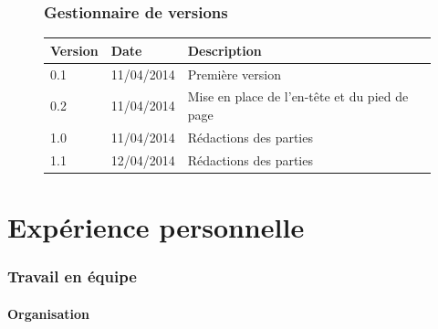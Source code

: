 \documentclass[12pt]{article}
\begin{document}
\setcounter{page}{2}
    	\begin{figure}[h]
        	\section*{Gestionnaire de versions}
		\centering
        	\begin{tabular}{|l|l|l|}
			\hline
            	\textbf{Version} & \textbf{Date} & \textbf{Description} \\
            	\hline
            	\hline
            		0.1 & 11/04/2014 & Première version \\
            	\hline
			0.2 & 11/04/2014 & Mise en place de l'en-tête et du pied de page \\
            	\hline
			1.0 & 11/04/2014 & Rédactions des parties \\
            	\hline
			1.1 & 12/04/2014 & Rédactions des parties \\
            	\hline
        	\end{tabular}
    	\end{figure}
\newpage

\renewcommand{\contentsname}{Sommaire}
\tableofcontents



\clearpage
\part*{Expérience personnelle}
\section{Travail en équipe}
\subsection{Organisation}
\end{document}
